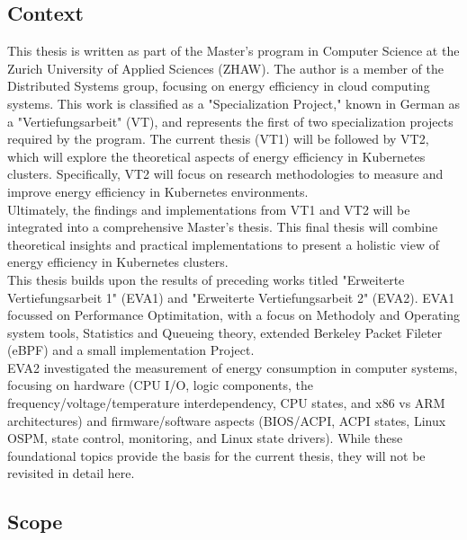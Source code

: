 \subsection{Context}

This thesis is written as part of the Master's program in Computer Science at the Zurich University of Applied Sciences (ZHAW). The author is a member of the Distributed Systems group, focusing on energy efficiency in cloud computing systems. This work is classified as a "Specialization Project," known in German as a "Vertiefungsarbeit" (VT), and represents the first of two specialization projects required by the program. The current thesis (VT1) will be followed by VT2, which will explore the theoretical aspects of energy efficiency in Kubernetes clusters. Specifically, VT2 will focus on research methodologies to measure and improve energy efficiency in Kubernetes environments.\\
Ultimately, the findings and implementations from VT1 and VT2 will be integrated into a comprehensive Master's thesis. This final thesis will combine theoretical insights and practical implementations to present a holistic view of energy efficiency in Kubernetes clusters.\\
This thesis builds upon the results of preceding works titled "Erweiterte Vertiefungsarbeit 1" (EVA1) and "Erweiterte Vertiefungsarbeit 2" (EVA2). EVA1 focussed on Performance Optimitation, with a focus on Methodoly and Operating system tools, Statistics and Queueing theory, extended Berkeley Packet Fileter (eBPF) and a small implementation Project.\\
EVA2 investigated the measurement of energy consumption in computer systems, focusing on hardware (CPU I/O, logic components, the frequency/voltage/temperature interdependency, CPU states, and x86 vs ARM architectures) and firmware/software aspects (BIOS/ACPI, ACPI states, Linux OSPM, state control, monitoring, and Linux state drivers). While these foundational topics provide the basis for the current thesis, they will not be revisited in detail here.\\

\subsection{Scope}


